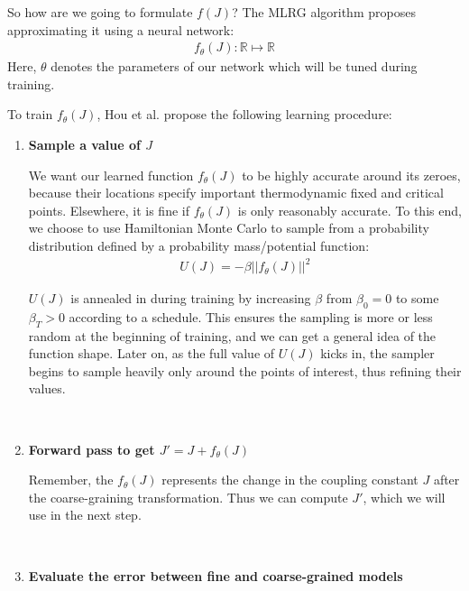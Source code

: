 \documentclass[%
    reprint,
    amsmath,amssymb,
    aps,
]{revtex4-2}
\begin{document}
So how are we going to formulate $f(J)$? 
The MLRG algorithm proposes approximating \cite{universal-approximation, relu-approximation} it using a neural network:
\begin{eqnarray}
    \label{eqn:neural-network}
    f_\theta(J) : \mathbb{R} \mapsto \mathbb{R}
\end{eqnarray}
Here, $\theta$ denotes the parameters of our network which will be tuned during training. 

To train $f_\theta(J)$, Hou et al. \cite{mlrg} propose the following learning procedure: 
\begin{enumerate}
    \item{
        \textbf{Sample a value of $J$}

        We want our learned function $f_\theta(J)$ to be highly accurate around its zeroes, because their locations specify important thermodynamic fixed and critical points. 
        Elsewhere, it is fine if $f_\theta(J)$ is only reasonably accurate. 
        To this end, we choose to use Hamiltonian Monte Carlo \cite{betancourt-hmc, duane-hmc} to sample from a probability distribution defined by a probability mass/potential function:
        \begin{eqnarray}
            \label{eqn:hmc-density}
            U(J) = -\beta || f_\theta(J) ||^2
        \end{eqnarray}
        
        $U(J)$ is annealed in during training by increasing $\beta$ from $\beta_0 = 0$ to some $\beta_T > 0$ according to a schedule. 
        This ensures the sampling is more or less random at the beginning of training, and we can get a general idea of the function shape. 
        Later on, as the full value of $U(J)$ kicks in, the sampler begins to sample heavily only around the points of interest, thus refining their values. 
    }\\
    
    \item{
        \textbf{Forward pass to get $J' = J + f_\theta(J)$}
        
        Remember, the $f_\theta(J)$ represents the change in the coupling constant $J$ after the coarse-graining transformation. 
        Thus we can compute $J'$, which we will use in the next step. 
    }\\
    
    \item {
        \textbf{Evaluate the error between fine and coarse-grained models}

}
\end{enumerate}
\end{document}

